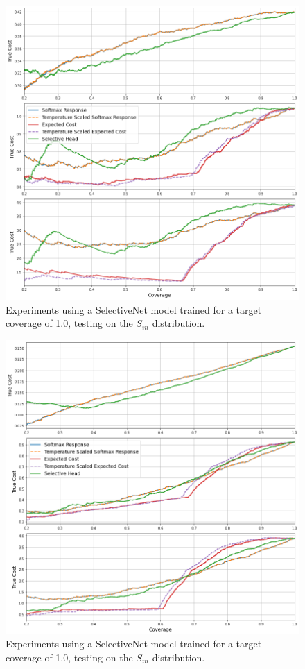 \begin{figure}[H]
	\includegraphics[width=\textwidth]{images/binary/sn1.0_out_distribution.png}
	\caption*{Experiments using a SelectiveNet model trained for a target coverage of 1.0, testing on the $S_{in}$ distribution.}
\end{figure}

\begin{figure}[H]
	\includegraphics[width=\textwidth]{images/binary/sn1.0_combine_distribution.png}
	\caption*{Experiments using a SelectiveNet model trained for a target coverage of 1.0, testing on the $S_{in}$ distribution.}
\end{figure}

